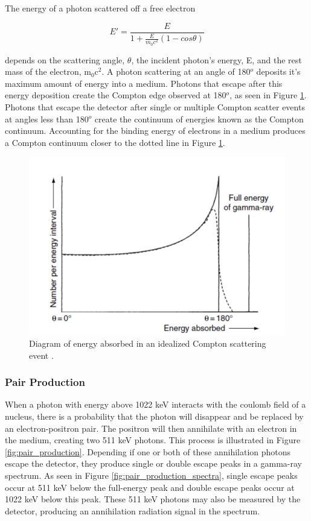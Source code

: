 The energy of a photon scattered off a free electron

\begin{equation} \label{eq:compton_scatter}
E' = \frac{E}{1 + \frac{E}{m_{0} c^2} (1-cos\theta)}
\end{equation}

depends on the scattering angle, $\theta$, the incident photon's energy, E, and the rest mass of the electron, m$_{0}$c$^{2}$. A photon scattering at an angle of 180$^{o}$ deposits it's maximum amount of energy into a medium. Photons that escape after this energy deposition create the Compton edge observed at 180$^{o}$, as seen in Figure \ref{fig:ideal_compton}. Photons that escape the detector after single or multiple Compton scatter events at angles less than 180$^{o}$ create the continuum of energies known as the Compton continuum. Accounting for the binding energy of electrons in a medium produces a Compton continuum closer to the dotted line in Figure \ref{fig:ideal_compton}.

\begin{figure}[H]
\centering
\includegraphics[width=0.75\linewidth]{images/ideal_compton}
\caption{Diagram of energy absorbed in an idealized Compton scattering event \cite{gilmore}.}
\label{fig:ideal_compton}
\end{figure}



\subsubsection{Pair Production}

When a photon with energy above 1022 keV interacts with the coulomb field of a nucleus, there is a probability that the photon will disappear and be replaced by an electron-positron pair. The positron will then annihilate with an electron in the medium, creating two 511 keV photons. This process is illustrated in Figure \ref{fig:pair_production}. Depending if one or both of these annihilation photons escape the detector, they produce single or double escape peaks in a gamma-ray spectrum. As seen in Figure \ref{fig:pair_production_spectra}, single escape peaks occur at 511 keV below the full-energy peak and double escape peaks occur at 1022 keV below this peak. These 511 keV photons may also be measured by the detector, producing an annihilation radiation signal in the spectrum.

